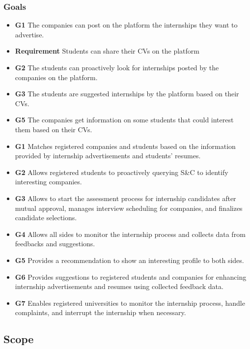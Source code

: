 \documentclass{article}
\begin{document}
\subsubsection{Goals}
\begin{itemize}
  \item \textbf{G1} The companies can post on the platform the internships they want to advertise.
  \item \textbf{Requirement} Students can share their CVs on the platform
  \item \textbf{G2} The students can proactively look for internships posted by the companies on the platform.
  \item \textbf{G3} The students are suggested internships by the platform based on their CVs.
  \item \textbf{G5} The companies get information on some students that could interest them based on their CVs.
  \item \textbf{G1} Matches registered companies and students based on the information provided by internship advertisements and students' resumes.
  \item \textbf{G2} Allows registered students to proactively querying S\&C to identify interesting companies.
   \item \textbf{G3} Allows to start the assessment process for internship candidates after mutual approval, manages interview scheduling for companies, and finalizes candidate selections.
   \item \textbf{G4} Allows all sides to monitor the internship process and collects data from feedbacks and suggestions.
    \item \textbf{G5} Provides a recommendation to show an interesting profile to both sides.
    \item \textbf{G6} Provides suggestions to registered students and companies for enhancing internship advertisements and resumes using collected feedback data.
    \item \textbf{G7} Enables registered universities to monitor the internship process, handle complaints, and interrupt the internship when necessary.

\end{itemize}
\subsection{Scope}
\end{document}
